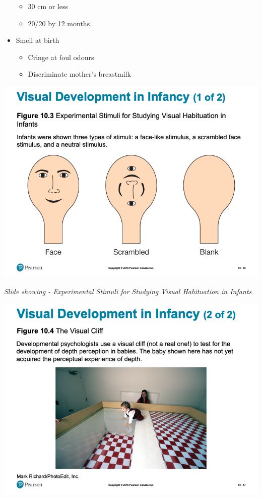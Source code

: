 \documentclass[
]{book}
\providecommand{\tightlist}{%
  \setlength{\itemsep}{0pt}\setlength{\parskip}{0pt}}
\begin{document}
\begin{reflect}
\begin{itemize}
  \begin{itemize}
  \tightlist
  \item
    30 cm or less\\
  \item
    20/20 by 12 months\\
  \end{itemize}
\item
  Smell at birth

  \begin{itemize}
  \tightlist
  \item
    Cringe at foul odours\\
  \item
    Discriminate mother's breastmilk
  \end{itemize}
\end{itemize}

\includegraphics{assets/unit_3/slide_16.png}

\emph{Slide showing - Experimental Stimuli for Studying Visual Habituation in Infants}

\includegraphics{assets/unit_3/slide_17.png}


\end{reflect}
\end{document}
